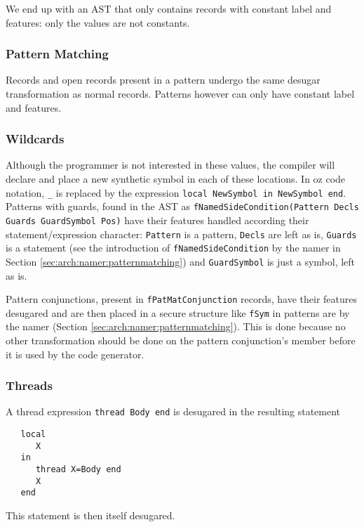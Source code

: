 \documentclass[a4paper]{memoir}
\begin{document}
We end up with an AST that only contains records with constant label and features: only the values are not constants.

\subsubsection{Pattern Matching}
Records and open records present in a pattern undergo the same desugar
transformation as normal records. Patterns however can only have constant label
and features.
\subsubsection{Wildcards}
Although the programmer is not interested in these values, the compiler will declare and place a new synthetic symbol in each of these locations. In oz code notation, \lstinline!_! is replaced by the expression \lstinline!local NewSymbol in NewSymbol end!.
Patterns with guards, found in the AST as \lstinline!fNamedSideCondition(Pattern Decls Guards GuardSymbol Pos)! 
have their features handled according their statement/expression character:
\lstinline!Pattern! is a pattern, \lstinline!Decls! are left as is,
\lstinline!Guards! is a statement (see the introduction
of \lstinline!fNamedSideCondition! by the namer in Section
\ref{sec:arch:namer:patternmatching}) and \lstinline!GuardSymbol! is just a
symbol, left as is.

Pattern conjunctions, present in \lstinline!fPatMatConjunction! records, have
their features desugared and are then placed in a secure structure like
\lstinline!fSym! in
patterns are by the namer (Section \ref{sec:arch:namer:patternmatching}).
This is done because no other transformation should be done on the pattern
conjunction's member before it is used by the code generator.


\subsubsection{Threads}
A thread expression \lstinline!thread Body end! is desugared in the resulting
statement 
\begin{lstlisting}
   local 
      X 
   in 
      thread X=Body end 
      X 
   end 
\end{lstlisting}

This statement is then itself desugared.
\end{document}
